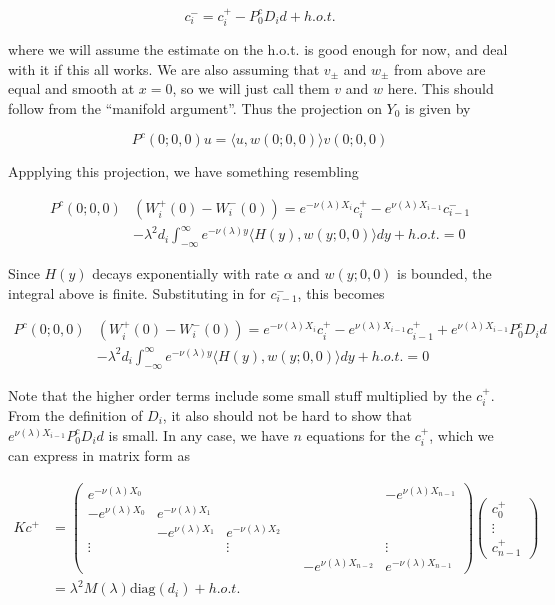 \documentclass[12pt]{article}
\begin{document}
\[
c_i^- = c_i^+ - P_0^c D_i d + h.o.t.
\]

where we will assume the estimate on the h.o.t. is good enough for now, and deal with it if this all works. We are also assuming that $v_\pm$ and $w_\pm$ from above are equal and smooth at $x = 0$, so we will just call them $v$ and $w$ here. This should follow from the ``manifold argument''. Thus the projection on $Y_0$ is given by

\[
P^c(0; 0, 0)u = \langle u, w(0; 0, 0) \rangle v(0; 0, 0)
\]

Appplying this projection, we have something resembling

\begin{align*}
P^c(0; 0, 0)&( W_i^+(0) - W_i^-(0)) = e^{-\nu(\lambda)X_i} c_i^+ - e^{\nu(\lambda)X_{i-1}} c_{i-1}^- \\
&- \lambda^2 d_i \int_{-\infty}^\infty e^{-\nu(\lambda)y} \langle H(y), w(y; 0, 0) \rangle dy + h.o.t.
= 0
\end{align*}

Since $H(y)$ decays exponentially with rate $\alpha$ and $w(y; 0, 0)$ is bounded, the integral above is finite. Substituting in for $c_{i-1}^-$, this becomes

\begin{align*}
P^c(0; 0, 0)&( W_i^+(0) - W_i^-(0)) = e^{-\nu(\lambda)X_i} c_i^+ - e^{\nu(\lambda)X_{i-1}} c_{i-1}^+ + e^{\nu(\lambda)X_{i-1}} P_0^c D_i d \\
&- \lambda^2 d_i \int_{-\infty}^\infty e^{-\nu(\lambda)y} \langle H(y), w(y; 0, 0) \rangle dy + h.o.t.
= 0
\end{align*}

Note that the higher order terms include some small stuff multiplied by the $c_i^+$. From the definition of $D_i$, it also should not be hard to show that $e^{\nu(\lambda)X_{i-1}} P_0^c D_i d$ is small. In any case, we have $n$ equations for the $c_i^+$, which we can express in matrix form as

\begin{align*}
K c^+ &= 
\begin{pmatrix}
e^{-\nu(\lambda)X_0} & & & & & -e^{\nu(\lambda)X_{n-1}} \\
-e^{\nu(\lambda)X_0} & e^{-\nu(\lambda)X_1} \\
& -e^{\nu(\lambda)X_1} & e^{-\nu(\lambda)X_2} \\
\vdots & & \vdots & &&  \vdots \\
& & & & -e^{\nu(\lambda)X_{n-2}} & e^{-\nu(\lambda)X_{n-1}} 
\end{pmatrix}
\begin{pmatrix}
c_0^+ \\ \vdots \\ c_{n-1}^+
\end{pmatrix}\\
&= \lambda^2 M(\lambda) \text{diag}(d_i) + h.o.t.
\end{align*}
\end{document}
